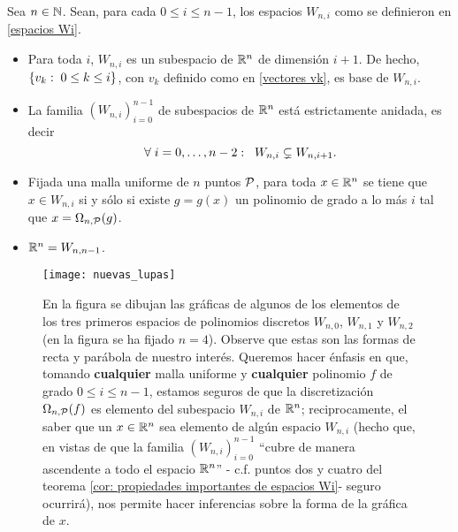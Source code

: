 \begin{teo}
\label{cor: propiedades importantes de espacios Wi}
Sea $n \in \mathbb{N}$. Sean, para cada $0 \leq i \leq n-1$,
los espacios $W_{n,i}$ como
se definieron en \eqref{espacios Wi}.
\begin{itemize}
\item Para toda $i$, $W_{n,i}$ es un subespacio
de $\mathbb{R}^{n}$ de dimensión $i+1$. De hecho, 
$\{v_{k}: \hspace{0.1cm} 0\leq k \leq i \}$, con
$v_{k}$ definido como en \eqref{vectores vk},
es base de $W_{n,i}$.

\item La familia $(W_{n,i})_{i=0}^{n-1}$ de subespacios
	de $\mathbb{R}^{n}$ está estrictamente anidada, es decir
	\begin{equation}
	\label{espacios Wi estan anidados}
	\forall \hspace{0.1cm}
	i = 0, \ldots , n-2: \hspace{0.2cm}
	W_{n,i} \subsetneq W_{n,i+1}.
	\end{equation}

\item 
Fijada una malla uniforme de $n$ puntos $\mathcal{P}$, 
para toda $x \in \mathbb{R}^{n}$
se tiene que $x \in W_{n,i}$ si y sólo si
existe $g=g(x)$ un polinomio de grado a lo más $i$
tal que $x = \Omega_{n, \mathcal{P}}(g)$.

\item $\mathbb{R}^{n}= W_{n,n-1}$.
\end{itemize}
\end{teo}

\begin{figure}[H]
\centering\captionsetup{format = hang}
	\begin{measuredfigure}
		\texttt{[image: nuevas\_lupas]} 
		\caption{
	En la figura	
	se dibujan las gráficas de algunos de los elementos
	de los tres primeros espacios de polinomios discretos
	$W_{n,0}$, $W_{n,1}$ y $W_{n,2}$
	(en la figura se ha fijado $n=4$).
    Observe que estas son
	las formas de recta y parábola de
	nuestro interés. 
	Queremos hacer énfasis en que, tomando
	\textbf{cualquier} malla uniforme y \textbf{cualquier} 
	polinomio $f$
	de grado $0 \leq i \leq n-1$, estamos seguros de que
	la discretización $\Omega_{n, \mathcal{P}}(f)$ es elemento
	del subespacio $W_{n,i}$ de $\mathbb{R}^{n}$; reciprocamente, el 
	saber que un $x \in \mathbb{R}^{n}$ sea elemento 
	de algún espacio $W_{n,i}$ (hecho
	que, en vistas de que la familia $(W_{n,i})_{i=0}^{n-1}$
	``cubre de manera ascendente a todo el espacio $\mathbb{R}^{n}$''
	- c.f. puntos dos y cuatro del teorema 
	\ref{cor: propiedades importantes de espacios Wi}- seguro 
	ocurrirá), nos permite hacer inferencias sobre la forma 
	de la gráfica de $x$.}
 	\end{measuredfigure}
 \end{figure}





